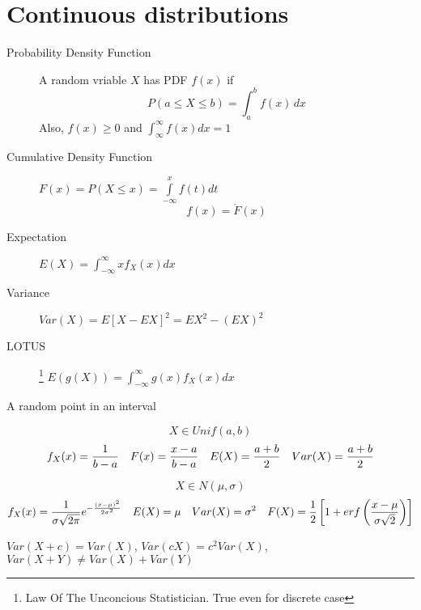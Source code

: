 \section{Continuous distributions}

\begin{slide}
\begin{description}
\item[Probability Density Function]
A random vriable $X$ has PDF $f(x)$ if $$P(a\leq X \leq b) = \int_a^bf(x)\,dx$$ Also, $f(x)\geq 0$ and $\int_{\infty}^\infty f(x)dx = 1$ 
\item[Cumulative Density Function]
$F(x) = P(X\leq x) = \int\limits_{-\infty}^xf(t)dt$
$$f(x) = \dot{F}(x)$$
\item[Expectation] $E(X) = \int_{-\infty}^\infty xf_X(x)dx$
\item[Variance] $Var(X) = E[X - EX]^2 = EX^2 - (EX)^2$
\item[LOTUS]\footnote[3]{Law Of The Unconcious Statistician. True even for discrete case} $E(g(X)) = \int_{-\infty}^\infty g(x)f_X(x)dx$
\end{description}

\end{slide}

\begin{slide}
\begin{shaded}
	\begin{center}
		A random point in an interval
	\end{center}
    $$X \in Unif(a,b)$$
    $$
    f_X(x) = {1\over b-a}  
    \quad 
    F(x)   = {x-a \over b-a}
    \quad
    E(X)   = {a+b \over 2} 
    \quad
    Var(X) = {a+b \over 2} 
    $$
\end{shaded}
\end{slide}

\begin{slide} 
  \begin{shaded}
    $$X \in N(\mu,\sigma)$$
    $$
    f_X(x) = {1\over \sigma \sqrt{2\pi}} e^{-{(x-\mu)^2 \over 2\sigma^2}} 
    \quad
    E(X)   = \mu
    \quad
    Var(X) =\sigma^2
    \quad 
    F(X)   = {1\over 2}\left[1+erf\left({x-\mu \over \sigma\sqrt{2}}\right)\right]
    $$
  \end{shaded}

$Var(X+c) = Var(X)$, $Var(cX) = c^2Var(X)$, $Var(X+Y) \neq Var(X) + Var(Y)$

\end{slide}

